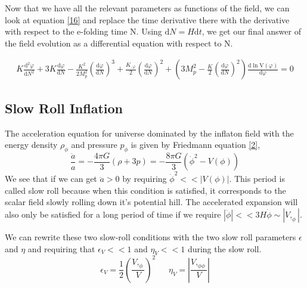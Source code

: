 \documentclass[aps,prd,reprint,preprintnumbers,showpacs,floatfix,nofootinbib,superscript address]{revtex4-2}
\begin{document}
Now that we have all the relevant parameters as functions of the field, we can look at equation \ref{16} and replace the time derivative there with the derivative with respect to the e-folding time N. Using $\text{d}N = H \text{d}t$, we get our final answer of the field evolution as a differential equation with respect to N.

\begin{widetext}
\begin{subequations}
\begin{align}\label{21}
    K\frac{\text{d}^2\varphi}{\text{d}N^2} +3 K \frac{\text{d}\varphi}{\text{d}N}  - \frac{K^2}{2M_p^2} \left(\frac{\text{d}\varphi}{\text{d}N} \right)^3  +  \frac{K_{,\varphi}}{2}  \left(\frac{\text{d}\varphi}{\text{d}N} \right)^2 +  \left( 3 M_p^2 - \frac{K}{2} \left(\frac{\text{d}\varphi}{\text{d}N} \right)^2 \right) \frac{\text{d}\ln \text{V}(\varphi)}{\text{d} \varphi} = 0    
\end{align}
\end{subequations}
\end{widetext}

\subsection{Slow Roll Inflation}
The acceleration equation for universe dominated by the inflaton field with the energy density $\rho_{\phi}$ and pressure $p_{\phi}$ is given by Friedmann equation \ref{2},
\begin{equation}
    \frac{\ddot{a}}{a} = -\frac{4\pi G}{3} (\rho +3p) = -\frac{8\pi G}{3} ({\dot{\phi}}^2 - V(\phi)) 
\end{equation}
We see that if we can get $\ddot{a} > 0$ by requiring $\dot{\phi}^2 << |V(\phi)|$. This period is called slow roll because when this condition is satisfied, it corresponds to the scalar field slowly rolling down it's potential hill. The accelerated expansion will also only be satisfied for a long period of time if we require $|\ddot{\phi}| << 3H\dot{\phi} \sim |V,_{\phi}|$. 

We can rewrite these two slow-roll conditions with the two slow roll parameters $\epsilon$ and $\eta$ and requiring that $\epsilon_V << 1$ and $\eta_V << 1$ during the slow roll. 
\begin{equation}
    \epsilon_V = \frac{1}{2}  \left( \frac{V,_{\phi}}{V} \right)^2 \,\,\,\,\,\,\,\,\ \eta_V = \left| \frac{V,_{\phi\phi}}{V} \right|
\end{equation}
\end{document}
